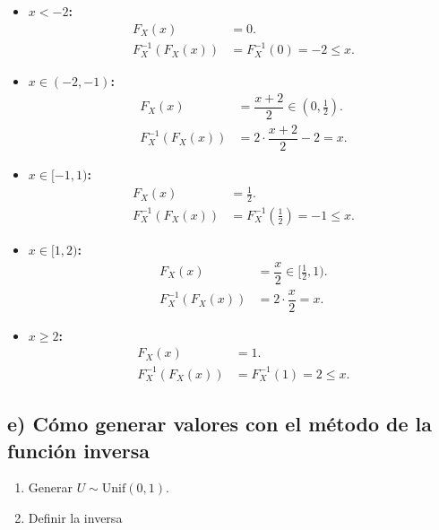 \documentclass[10pt,a4paper]{article}
\begin{document}
    \begin{itemize}
\item
  \textbf{\(x<-2\):}\\
  \[
  \begin{align*}
  F_X(x) &= 0. \\
  F_X^{-1}(F_X(x)) &= F_X^{-1}(0) = -2 \leq x.
  \end{align*}
  \]
\item
  \textbf{\(x\in(-2,-1)\):}\\
  \[
  \begin{align*}
  F_X(x) &= \dfrac{x+2}{2} \in (0,\tfrac12). \\
  F_X^{-1}(F_X(x)) &= 2\cdot\dfrac{x+2}{2}-2 = x. 
  \end{align*}
  \]
\item
  \textbf{\(x\in[-1,1)\):}\\
  \[
  \begin{align*}
  F_X(x) &= \tfrac12. \\
  F_X^{-1}(F_X(x)) &= F_X^{-1}(\tfrac12) = -1 \leq x.
  \end{align*}
  \]
\item
  \textbf{\(x\in[1,2)\):}\\
  \[
  \begin{align*}
  F_X(x) &= \dfrac{x}{2} \in [\tfrac12,1). \\
  F_X^{-1}(F_X(x)) &= 2\cdot\dfrac{x}{2} = x. 
  \end{align*}
  \]
\item
  \textbf{\(x\geq 2\):}\\
  \[
  \begin{align*}
  F_X(x) &= 1. \\
  F_X^{-1}(F_X(x)) &= F_X^{-1}(1) = 2 \leq x.
  \end{align*}
  \]
\end{itemize}

    \hypertarget{e-cuxf3mo-generar-valores-con-el-muxe9todo-de-la-funciuxf3n-inversa}{%
\subsection{e) Cómo generar valores con el método de la función
inversa}\label{e-cuxf3mo-generar-valores-con-el-muxe9todo-de-la-funciuxf3n-inversa}}

    \begin{enumerate}
\def\labelenumi{\arabic{enumi}.}
\item
  Generar \(U\sim\mathrm{Unif}(0,1)\).
\item
  Definir la inversa
\end{enumerate}
\end{document}
